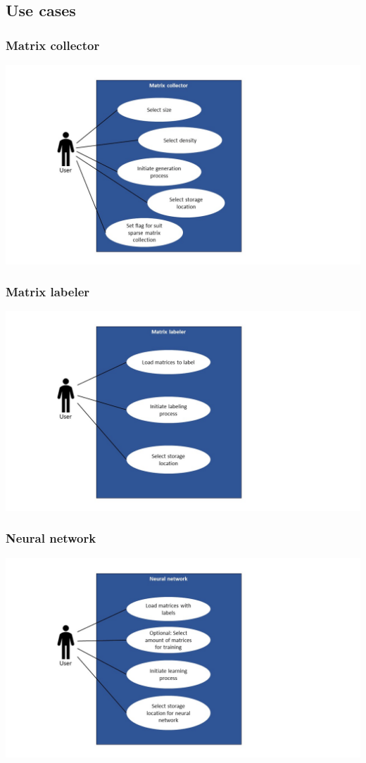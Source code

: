 \documentclass[parskip=full]{scrartcl}
\begin{document}
\subsection{Use cases}
\subsubsection{Matrix \gls{collector}}
\includegraphics[width=1.3\textwidth]{useCase_collector}
\subsubsection{Matrix labeler}
\includegraphics[width=1.3\textwidth]{useCase_Labeler}
\subsubsection{Neural network}
\includegraphics[width=1.3\textwidth]{useCase_NeuralNetwork}
\end{document}
